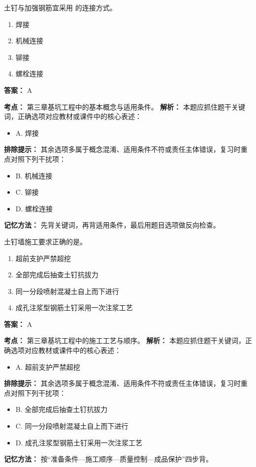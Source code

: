 \documentclass[UTF8,fontset=fandol,11pt]{ctexart}
\begin{document}
\begin{quizbox}[title={第 9 题}]
土钉与加强钢筋宜采用 的连接方式。\\
\begin{enumerate}[label=\Alph*.]
\item 焊接
\item 机械连接
\item 铆接
\item 螺栓连接
\end{enumerate}
\textbf{答案：} A
\vspace{0.25em}
\begin{answerbox}[title={考点解析}]
\textbf{考点：} 第三章基坑工程中的基本概念与适用条件。
\textbf{解析：} 本题应抓住题干关键词，正确选项对应教材或课件中的核心表述：
\begin{itemize}
\item A. 焊接
\end{itemize}
\textbf{排除提示：} 其余选项多属于概念混淆、适用条件不符或责任主体错误，复习时重点对照下列干扰项：
\begin{itemize}
\item B. 机械连接
\item C. 铆接
\item D. 螺栓连接
\end{itemize}
\textbf{记忆方法：} 先背关键词，再背适用条件，最后用题目选项做反向检查。
\end{answerbox}
\end{quizbox}

\vspace{0.2em}

\begin{quizbox}[title={第 10 题}]
土钉墙施工要求正确的是。\\
\begin{enumerate}[label=\Alph*.]
\item 超前支护严禁超挖
\item 全部完成后抽查土钉抗拔力
\item 同一分段喷射混凝土自上而下进行
\item 成孔注浆型钢筋土钉采用一次注浆工艺
\end{enumerate}
\textbf{答案：} A
\vspace{0.25em}
\begin{answerbox}[title={考点解析}]
\textbf{考点：} 第三章基坑工程中的施工工艺与顺序。
\textbf{解析：} 本题应抓住题干关键词，正确选项对应教材或课件中的核心表述：
\begin{itemize}
\item A. 超前支护严禁超挖
\end{itemize}
\textbf{排除提示：} 其余选项多属于概念混淆、适用条件不符或责任主体错误，复习时重点对照下列干扰项：
\begin{itemize}
\item B. 全部完成后抽查土钉抗拔力
\item C. 同一分段喷射混凝土自上而下进行
\item D. 成孔注浆型钢筋土钉采用一次注浆工艺
\end{itemize}
\textbf{记忆方法：} 按“准备条件—施工顺序—质量控制—成品保护”四步背。
\end{answerbox}
\end{quizbox}
\end{document}
